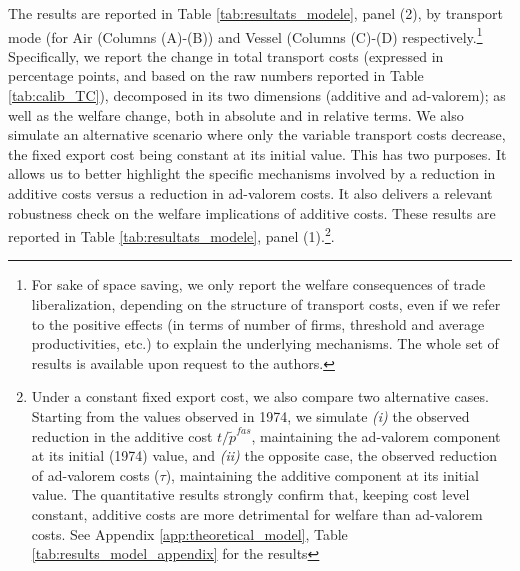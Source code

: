 \documentclass[a4paper,11pt]{article}
\begin{document}
The results are reported in Table \ref{tab:resultats_modele}, panel (2), by transport mode (for Air (Columns (A)-(B)) and Vessel (Columns (C)-(D) respectively.\footnote{For sake of space saving, we only report the welfare consequences of trade liberalization, depending on the structure of transport costs, even if we refer to the positive effects (in terms of number of firms, threshold and average productivities, etc.) to explain the underlying mechanisms. The whole set of results is available upon request to the authors.} Specifically, we report the change in total transport costs (expressed in percentage points, and based on the raw numbers reported in Table \ref{tab:calib_TC}), decomposed in its two dimensions (additive and ad-valorem); as well as the welfare change, both in absolute and in relative terms.
We also simulate an alternative scenario where only the variable transport costs decrease, the fixed export cost being constant at its initial value. This has two purposes. It allows us to better highlight the specific mechanisms involved by a reduction in additive costs versus a reduction in ad-valorem costs. It also delivers a relevant robustness check on the welfare implications of additive costs. These results are reported in Table \ref{tab:resultats_modele}, panel (1).\footnote{Under a constant fixed export cost, we also compare two alternative cases. Starting from the values observed in 1974, we simulate \textit{(i)} the observed reduction in the additive cost $t/\widetilde{p}^{fas}$, maintaining the ad-valorem component at its initial (1974) value, and  \textit{(ii)} the opposite case, the observed reduction of ad-valorem costs ($\tau$), maintaining the additive component at its initial value. The quantitative results strongly confirm that, keeping cost level constant, additive costs are more detrimental for welfare than ad-valorem costs.
See Appendix \ref{app:theoretical_model}, Table \ref{tab:results_model_appendix} for the results}.
\end{document}
